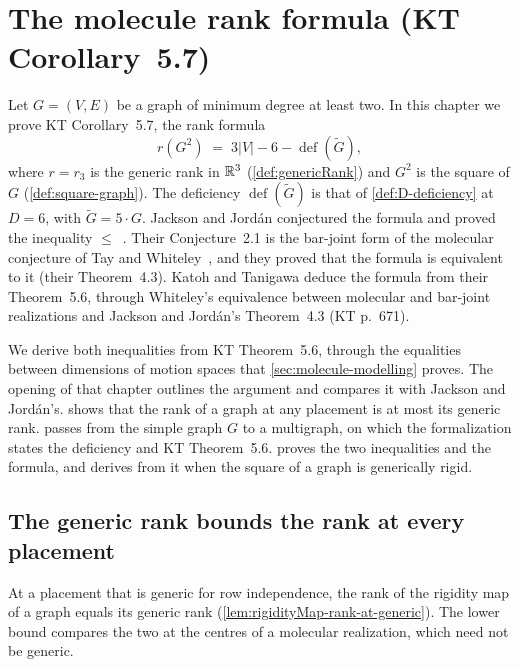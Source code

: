 \section{The molecule rank formula (KT Corollary~5.7)}
\label{sec:molecule-application}

Let $G = (V, E)$ be a graph of minimum degree at least two. In this
chapter we prove KT Corollary~5.7, the rank formula
\[
  r(G^2) \;=\; 3|V| - 6 - \operatorname{def}(\tilde G),
\]
where $r = r_3$ is the generic rank in ${\mathbb{R}}^3$ (\cref{def:genericRank})
and $G^2$ is the square of $G$ (\cref{def:square-graph}). The deficiency
$\operatorname{def}(\tilde G)$ is that of \cref{def:D-deficiency} at
$D = 6$, with $\tilde G = 5 \cdot G$. Jackson and Jord\'an conjectured
the formula and proved the inequality
$\le$~\cite[Conjecture~2.2 and Theorem~4.1]{jacksonJordan2008}. Their
Conjecture~2.1 is the bar-joint form of the molecular conjecture of Tay
and Whiteley~\cite{tayWhiteley1984}, and they proved that the formula is
equivalent to it (their Theorem~4.3). Katoh and Tanigawa deduce the
formula from their Theorem~5.6, through Whiteley's equivalence between
molecular and bar-joint realizations and Jackson and Jord\'an's
Theorem~4.3 (KT p.~671).

We derive both inequalities from KT Theorem~5.6, through the equalities
between dimensions of motion spaces that \cref{sec:molecule-modelling}
proves. The opening of that chapter outlines the argument and compares
it with Jackson and Jord\'an's.
 shows that the rank of a
graph at any placement is at most its generic rank.
 passes from the simple graph $G$
to a multigraph, on which the formalization states the deficiency and
KT Theorem~5.6.  proves the two
inequalities and the formula, and derives from it when the square of a
graph is generically rigid.

\subsection{The generic rank bounds the rank at every placement}
\label{sec:molecule-application-domination}

At a placement that is generic for row independence, the rank of the
rigidity map of a graph equals its generic rank
(\cref{lem:rigidityMap-rank-at-generic}). The lower bound compares the
two at the centres of a molecular realization, which need not be
generic.

